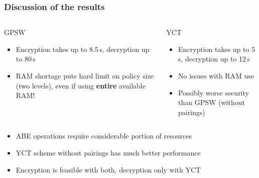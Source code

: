 \begin{frame}[t]
    \frametitle{Discussion of the results}
    \centering
    \vspace{1.5cm}
    \begin{columns}[t]
        \begin{block}{\centering GPSW}
            \begin{itemize}
                \item Encryption takes up to 8.5\,s, decryption up to 80\,s
                \item RAM shortage puts hard limit on policy size (two levels), even if using \textbf{entire} available RAM!
            \end{itemize}
        \end{block}
        \begin{block}{\centering YCT}
            \begin{itemize}
                \item Encryption takes up to 5\,s, decryption up to 12\,s
                \item No issues with RAM use
                \item Possibly worse security than GPSW (without pairings)
            \end{itemize}
        \end{block}
    \end{columns}
    \vspace{0.5cm}
    \begin{minipage}{.5\textwidth}
        \begin{itemize}
            \color{TUMOrange}
            [arrow]
            \item<2-> ABE operations require considerable portion of resources
            \item<3-> YCT scheme without pairings has much better performance
            \item<4-> Encryption is feasible with both, decryption only with YCT
        \end{itemize}
    \end{minipage}
\end{frame}

